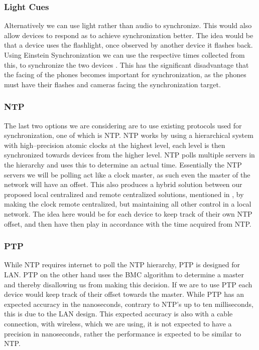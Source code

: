 \subsubsection{Light Cues}
Alternatively we can use light rather than audio to synchronize.
This would also allow devices to respond as to achieve synchronization better.
The idea would be that a device uses the flashlight, once observed by another device it flashes back.
Using Einstein Synchronization we can use the respective times collected from this, to synchronize the two devices \citep{einstein}.
This has the significant disadvantage that the facing of the phones becomes important for synchronization, as the phones must have their flashes and cameras facing the synchronization target.

\subsubsection{\acl{NTP}}
The last two options we are considering are to use existing protocols used for synchronization, one of which is \ac{NTP}.
\ac{NTP} works by using a hierarchical system with high--precision atomic clocks at the highest level, each level is then synchronized towards devices from the higher level.
\ac{NTP} polls multiple servers in the hierarchy and uses this to determine an actual time.
Essentially the \ac{NTP} servers we will be polling act like a clock master, as such even the master of the network will have an offset.
This also produces a hybrid solution between our proposed local centralized and remote centralized solutions, mentioned in , by making the clock remote centralized, but maintaining all other control in a local network.
The idea here would be for each device to keep track of their own \ac{NTP} offset, and then have then play in accordance with the time acquired from \ac{NTP}. 

\subsubsection{\acl{PTP}}
While \ac{NTP} requires internet to poll the \ac{NTP} hierarchy, \ac{PTP} is designed for LAN.
\ac{PTP} on the other hand uses the \ac{BMC} algorithm to determine a master and thereby disallowing us from making this decision.
If we are to use \ac{PTP} each device would keep track of their offset towards the master.
While \ac{PTP} has an expected accuracy in the nanoseconds, contrary to NTP's up to ten milliseconds, this is due to the LAN design.
This expected accuracy is also with a cable connection, with wireless, which we are using, it is not expected to have a precision in nanoseconds, rather the performance is expected to be similar to \ac{NTP}.

